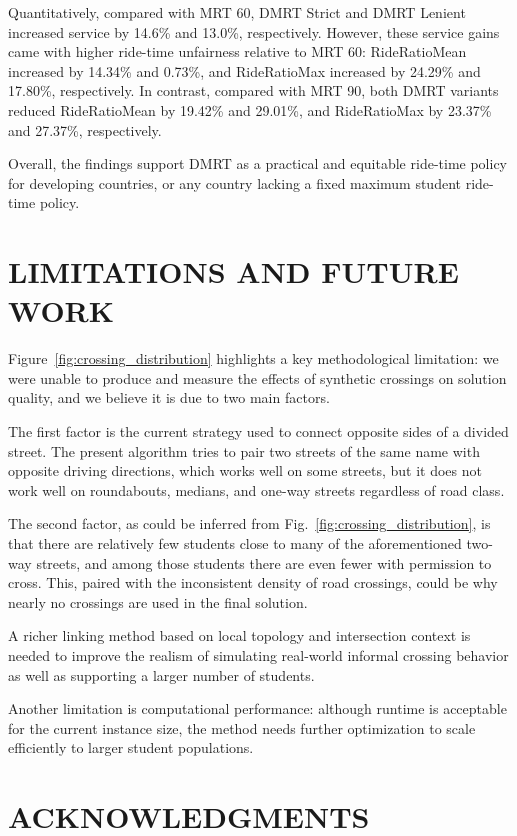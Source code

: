 \documentclass[journal]{IEEEtran}
\begin{document}
Quantitatively, compared with MRT 60, DMRT Strict and DMRT Lenient increased service by 14.6\% and 13.0\%, respectively. However, these service gains came with higher ride-time unfairness relative to MRT 60: RideRatioMean increased by 14.34\% and 0.73\%, and RideRatioMax increased by 24.29\% and 17.80\%, respectively. In contrast, compared with MRT 90, both DMRT variants reduced RideRatioMean by 19.42\% and 29.01\%, and RideRatioMax by 23.37\% and 27.37\%, respectively.

Overall, the findings support DMRT as a practical and equitable
ride-time policy for developing countries, or any country lacking a fixed maximum student ride-time policy.

\section{LIMITATIONS AND FUTURE WORK}
Figure~\ref{fig:crossing_distribution} highlights a key
methodological limitation: we were unable to produce and measure the effects of
synthetic crossings on solution quality, and we believe it is due to two main factors.

The first factor is the current strategy used to connect opposite
sides of a divided street. The present algorithm tries to pair two streets of the same name with opposite driving directions,
which works well on some streets, but it does not work well on roundabouts, medians, and one-way streets regardless of road class.

The second factor, as could be inferred from Fig.~\ref{fig:crossing_distribution}, is that there are relatively few students close to many of the aforementioned two-way streets,
and among those students there are even fewer with permission to cross. This, paired with the inconsistent density of road crossings,
could be why nearly no crossings are used in the final solution.

A richer linking method based on local topology and intersection context is needed to improve
the realism of simulating real-world informal crossing behavior as well as supporting a larger number of students.

Another limitation is computational performance: although runtime is acceptable for the current instance size,
the method needs further optimization to scale efficiently to larger student populations.

\section{ACKNOWLEDGMENTS}
\end{document}
